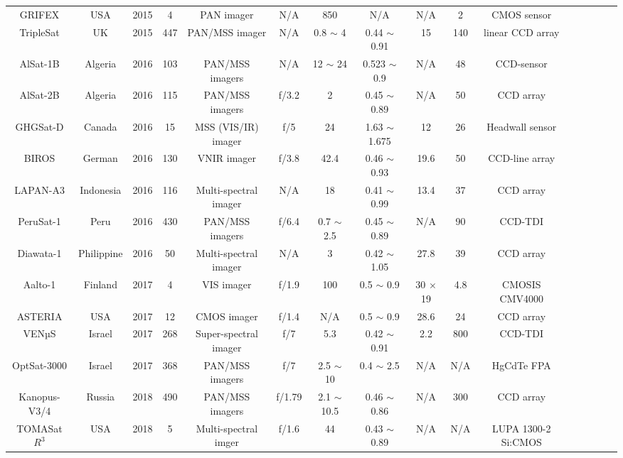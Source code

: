 \documentclass[final,5p,times,sort&compress,twocolumn]{elsarticle}
\begin{document}
\begin{table}
{\begin{tabular}{c c c c c c c c c c c c c c c c}
		    GRIFEX & USA & 2015 & 4 & PAN imager & N/A & 850 & N/A &  N/A & 2 &  CMOS sensor & \cite{eoportal}   \\
		    TripleSat & UK & 2015 & 447 & PAN/MSS imager & N/A & 0.8 $\sim$ 4 & 0.44 $\sim$ 0.91 & 15 & 140 & linear CCD array &\cite{eoportal}\\		     
		    AlSat-1B & Algeria & 2016 & 103 & PAN/MSS imagers & N/A & 12 $\sim$ 24 & 0.523 $\sim$ 0.9 &  N/A & 48 &  CCD-sensor & \cite{serief2017estimate}\\		      
		    AlSat-2B & Algeria & 2016 & 115 & PAN/MSS imagers & f/3.2 & 2 & 0.45 $\sim$ 0.89 &  N/A & 50 & CCD array & \cite{wahballah2020survey}\\	
		    GHGSat-D & Canada & 2016 & 15 & MSS (VIS/IR) imager & f/5 & 24 & 1.63 $\sim$ 1.675 &  12 & 26 & Headwall sensor & \cite{jervis2021ghgsat}\\	
		    BIROS & German & 2016 & 130 & VNIR imager & f/3.8 & 42.4 & 0.46 $\sim$ 0.93 & 19.6 & 50 & CCD-line array & \cite{lorenz2015remote} \\
		    LAPAN-A3 & Indonesia & 2016 & 116 & Multi-spectral imager & N/A & 18 & 0.41 $\sim$ 0.99 & 13.4 & 37 &  CCD array & \cite{khamsah2019development}\\		    
		    PeruSat-1 & Peru & 2016 & 430 & PAN/MSS imagers & f/6.4 & 0.7 $\sim$ 2.5 & 0.45 $\sim$ 0.89 &  N/A & 90 &  CCD-TDI & \cite{wahballah2020survey}\\	
		    Diawata-1 & Philippine & 2016 & 50 & Multi-spectral imager & N/A & 3 & 0.42 $\sim$ 1.05 &  27.8 & 39 & CCD array & \cite{eoportal}\\	
		    Aalto-1 & Finland & 2017 & 4 & VIS imager & f/1.9 & 100 & 0.5 $\sim$ 0.9 &  30 $\times$ 19 & 4.8 &  CMOSIS CMV4000 & \cite{mughal2021aalto}\\		
		    ASTERIA & USA & 2017 & 12 & CMOS imager & f/1.4 & N/A & 0.5 $\sim$ 0.9 & 28.6 & 24 &  CCD array & \cite{eoportal}\\		    
 		   VENµS & Israel & 2017 & 268 & Super-spectral imager & f/7 & 5.3 & 0.42 $\sim$ 0.91 &  2.2 & 800 &  CCD-TDI & \cite{eoportal}\\	
		    OptSat-3000 & Israel & 2017 & 368 & PAN/MSS imagers & f/7 & 2.5 $\sim$ 10 & 0.4 $\sim$ 2.5 & N/A & N/A &  HgCdTe FPA & \cite{qian2015optical}\\ 		
 		   Kanopus-V3/4 & Russia & 2018 & 490 & PAN/MSS imagers & f/1.79 & 2.1 $\sim$ 10.5 & 0.46 $\sim$ 0.86 &  N/A & 300 &  CCD array & \cite{spacef2018}\\
 		   TOMASat $R^3$ & USA & 2018 & 5 & Multi-spectral imger & f/1.6 & 44 & 0.43 $\sim$ 0.89 &  N/A & N/A &  LUPA 1300-2 Si:CMOS & \cite{eoportal}\\ 

\end{tabular}}
\end{table}
\end{document}

